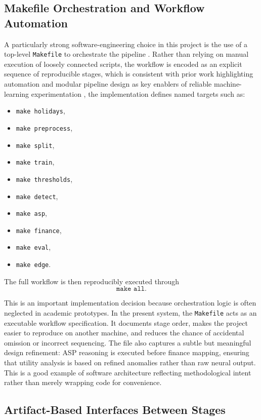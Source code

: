 \subsection{Makefile Orchestration and Workflow Automation}

A particularly strong software-engineering choice in this project is the use of a top-level \texttt{Makefile} to orchestrate the pipeline \cite{repo_thesis_grid_anomaly}. Rather than relying on manual execution of loosely connected scripts, the workflow is encoded as an explicit sequence of reproducible stages, which is consistent with prior work highlighting automation and modular pipeline design as key enablers of reliable machine-learning experimentation \cite{bousbiat:TII2022}, the implementation defines named targets such as:
\begin{itemize}
	\item \texttt{make holidays},
	\item \texttt{make preprocess},
	\item \texttt{make split},
	\item \texttt{make train},
	\item \texttt{make thresholds},
	\item \texttt{make detect},
	\item \texttt{make asp},
	\item \texttt{make finance},
	\item \texttt{make eval},
	\item \texttt{make edge}.
\end{itemize}
The full workflow is then reproducibly executed through
\begin{equation}
	\texttt{make all}.
\end{equation}

This is an important implementation decision because orchestration logic is often neglected in academic prototypes. In the present system, the \texttt{Makefile} acts as an executable workflow specification. It documents stage order, makes the project easier to reproduce on another machine, and reduces the chance of accidental omission or incorrect sequencing. The file also captures a subtle but meaningful design refinement: ASP reasoning is executed before finance mapping, ensuring that utility analysis is based on refined anomalies rather than raw neural output. This is a good example of software architecture reflecting methodological intent rather than merely wrapping code for convenience.

\subsection{Artifact-Based Interfaces Between Stages}

